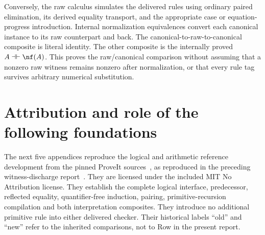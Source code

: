 Conversely, the raw calculus simulates the delivered rules using ordinary
paired elimination, its derived equality transport, and the appropriate case
or equation-progress introduction. Internal normalization equivalences
convert each canonical instance to its raw counterpart and back. The
canonical-to-raw-to-canonical composite is literal identity. The other
composite is the internally proved $A\dashv\vdash\nf(A)$. This proves the
raw/canonical comparison without assuming that a nonzero raw witness remains
nonzero after normalization, or that every rule tag survives arbitrary
numerical substitution.

\clearpage
\section*{Attribution and role of the following foundations}
The next five appendices reproduce the logical and arithmetic reference
development from the pinned ProveIt sources~\cite{choice,erasure,forward,progress},
as reproduced in the preceding witness-discharge report~\cite{prior}.
They are licensed under the included MIT No Attribution license. They
establish the complete logical interface, predecessor, reflected equality,
quantifier-free induction, pairing, primitive-recursion compilation and both
interpretation composites. They introduce no additional primitive rule into
either delivered checker. Their historical labels ``old'' and ``new'' refer
to the inherited comparisons, not to Row in the present report.
